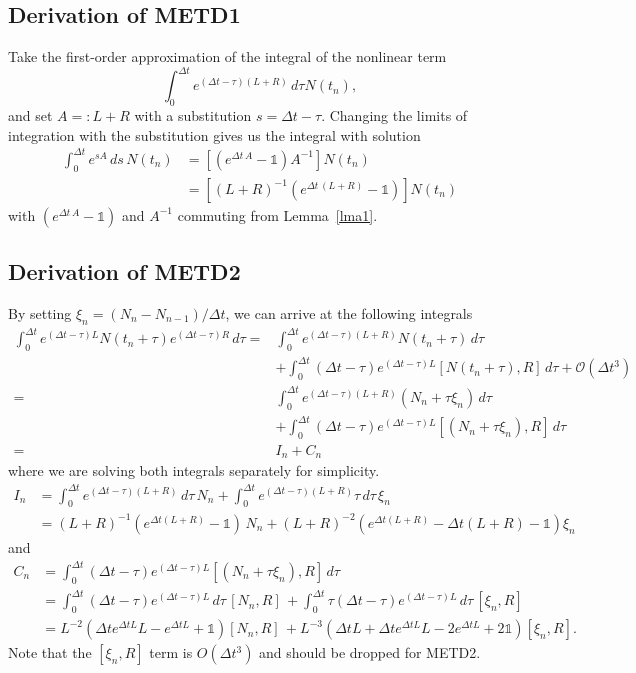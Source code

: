 \documentclass[12pt]{article}
\begin{document}
\subsection{Derivation of METD1}
\label{ETD1_deriv}
Take the first-order approximation of the integral of the nonlinear term
\begin{equation*}
    \int_0^{\Delta t} e^{(\Delta t-\tau)(L+R)} \,d\tau N(t_n),
\end{equation*}
and set $A=: L+R$ with a substitution $s = \Delta t-\tau$. Changing the limits of integration with the substitution gives us the integral with solution 
\begin{align*}
    \int_0^{\Delta t} e^{sA} \,ds \,N(t_n) &= [\left( e^{\Delta t \,A} - \mathds{1}\right)A^{-1}]N(t_n)
    \\ &= [(L+R)^{-1} \left( e^{\Delta t \,(L+R)} - \mathds{1}\right)]N(t_n)
\end{align*}
with $\left( e^{\Delta t \,A} - \mathds{1}\right)$ and $A^{-1}$ commuting from Lemma~\ref{lma1}.

\subsection{Derivation of METD2}
\label{app:METD_deriv}
By setting $\xi_n = (N_{n}- N_{n-1})/\Delta t$, we can arrive at the following integrals 
\begin{align*}
    \int_0^{\Delta t} e^{(\Delta t-\tau)L} N(t_n+\tau) e^{(\Delta t-\tau)R}\,d\tau =&\int_0^{\Delta t} e^{(\Delta t-\tau)(L+R)} N(t_n+\tau)\,d\tau \\ &+ \int_0^{\Delta t} (\Delta t-\tau) e^{(\Delta t-\tau)L} [N(t_n+\tau),R]\,d\tau + \mathcal O(\Delta t^3) \\= 
    &\int_0^{\Delta t} e^{(\Delta t-\tau)(L+R)} (N_n + \tau \xi_n)\,d\tau \, \\ &+ \int_0^{\Delta t} (\Delta t-\tau) e^{(\Delta t-\tau)L} [(N_n + \tau \xi_n),R]\,d\tau \\=& I_n + C_n
\end{align*}
where we are solving both integrals separately for simplicity.
\begin{align*}
    I_n &= \int_0^{\Delta t} e^{(\Delta t-\tau)(L+R)}\,d\tau\, N_n + \int_0^{\Delta t} e^{(\Delta t-\tau)(L+R)} \tau \,d\tau\, \xi_n \\
    &= (L+R)^{-1}\left(e^{\Delta t (L+R)} - \mathds{1}\right)\,N_n + (L+R)^{-2}\left(e^{\Delta t (L+R)} - \Delta t (L+R) - \mathds{1}\right)\xi_n
\end{align*}
and
\begin{align*}
    C_n &=  \int_0^{\Delta t} (\Delta t-\tau) e^{(\Delta t-\tau)L} [(N_n + \tau \xi_n),R]\,d\tau\\
    &= \int_0^{\Delta t} (\Delta t-\tau) e^{(\Delta t-\tau)L}\,d\tau\, [N_n,R] \, + \int_0^{\Delta t} \tau (\Delta t-\tau) e^{(\Delta t-\tau)L}\,d\tau\, [\xi_n,R]\\
    &= L^{-2} \left( \Delta t e^{\Delta t L}L -  e^{\Delta t L} + \mathds{1}  \right)  [N_n,R] \,+
    L^{-3} \left(  \Delta t L + \Delta t e^{\Delta t L}L -  2e^{\Delta t L} + 2 \mathds{1}  \right)[\xi_n,R].
\end{align*}
Note that the $[\xi_n,R]$ term is $O(\Delta t^3)$ and should be dropped for METD2.
\end{document}
